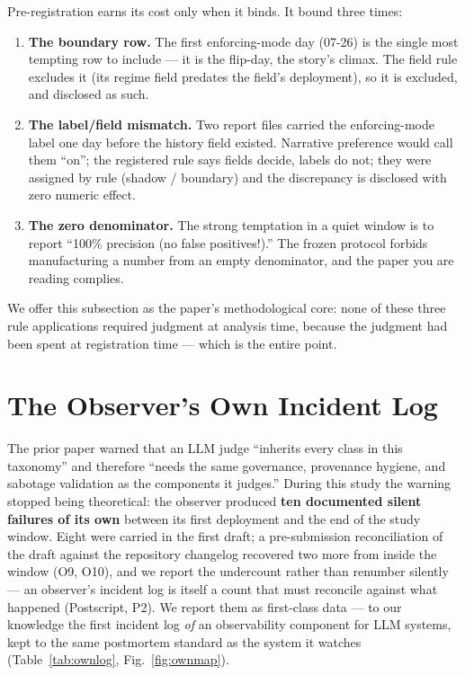 \documentclass[11pt]{article}
\begin{document}
Pre-registration earns its cost only when it binds. It bound three
times:

\begin{enumerate}
\item \textbf{The boundary row.} The first enforcing-mode day (07-26)
  is the single most tempting row to include --- it is the flip-day,
  the story's climax. The field rule excludes it (its regime field
  predates the field's deployment), so it is excluded, and disclosed as
  such.
\item \textbf{The label/field mismatch.} Two report files carried the
  enforcing-mode label one day before the history field existed.
  Narrative preference would call them ``on''; the registered rule says
  fields decide, labels do not; they were assigned by rule (shadow /
  boundary) and the discrepancy is disclosed with zero numeric effect.
\item \textbf{The zero denominator.} The strong temptation in a quiet
  window is to report ``100\% precision (no false positives!).'' The
  frozen protocol forbids manufacturing a number from an empty
  denominator, and the paper you are reading complies.
\end{enumerate}

We offer this subsection as the paper's methodological core: none of
these three rule applications required judgment at analysis time,
because the judgment had been spent at registration time --- which is
the entire point.

\section{The Observer's Own Incident Log}
\label{sec:ownlog}

The prior paper warned that an LLM judge ``inherits every class in this
taxonomy'' and therefore ``needs the same governance, provenance
hygiene, and sabotage validation as the components it judges.'' During
this study the warning stopped being theoretical: the observer produced
\textbf{ten documented silent failures of its own} between its first
deployment and the end of the study window. Eight were carried in the
first draft; a pre-submission reconciliation of the draft against the
repository changelog recovered two more from inside the window (O9,
O10), and we report the undercount rather than renumber silently --- an
observer's incident log is itself a count that must reconcile against
what happened (Postscript, P2). We report them as
first-class data --- to our knowledge the first incident log \emph{of}
an observability component for LLM systems, kept to the same postmortem
standard as the system it watches
(Table~\ref{tab:ownlog}, Fig.~\ref{fig:ownmap}).
\end{document}
